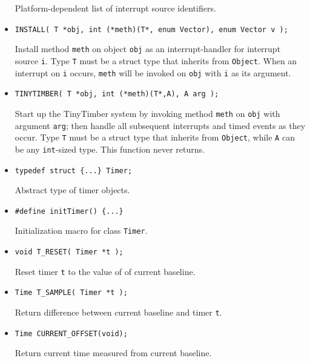 \documentclass[12pt]{article}
\begin{document}
\begin{itemize}
Platform-dependent list of interrupt source identifiers.

\item {\tt INSTALL( T *obj, int (*meth)(T*, enum Vector), enum Vector v );}

Install method {\tt meth} on object {\tt obj} as an interrupt-handler for interrupt source {\tt i}. Type {\tt T} must be a struct type that inherits
from {\tt Object}. When an interrupt on {\tt i} occurs, {\tt meth} will be invoked on {\tt obj} with {\tt i} as its argument. 

\item {\tt TINYTIMBER( T *obj, int (*meth)(T*,A), A arg );}

Start up the TinyTimber system by invoking method {\tt meth} on {\tt obj} with argument {\tt arg}; then handle all subsequent interrupts and timed
events as they occur. Type {\tt T} must be a struct type that inherits from {\tt Object}, while {\tt A} can be any {\tt int}-sized type. This function never
returns.

\item {\tt typedef struct \{...\} Timer;}

Abstract type of timer objects.

\item {\tt \#define initTimer() \{...\}}

Initialization macro for class {\tt Timer}.

\item {\tt void T\_RESET( Timer *t );}

Reset timer {\tt t} to the value of of current baseline.

\item {\tt Time T\_SAMPLE( Timer *t );}

Return difference between current baseline and timer {\tt t}.

\item {\tt Time CURRENT\_OFFSET(void);}

Return current time measured from current baseline.

\end{itemize}
\end{document}
